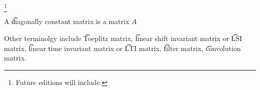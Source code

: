 
\footnote{Future editions will include.}


A \t{diagonally constant matrix} is a matrix $A$

Other terminolgy include \t{Toeplitz matrix}, \t{linear shift invariant matrix} or \t{LSI matrix}, \t{linear time invariant matrix} or \t{LTI matrix}, \t{filter matrix}, \t{convolution matrix}.

\blankpage
